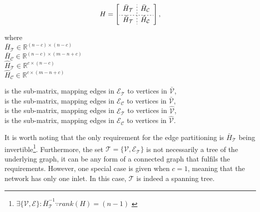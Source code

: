 \begin{equation}
\label{H_matrix_sub}
H=
\left[
\begin{array}{c;{2pt/2pt}r}
\bar{H}_{\mathcal{T}} & \bar{H}_{\mathcal{C}} \\[3pt]
\hdashline[2pt/2pt] 
\hat{H}_{\mathcal{T}} & \hat{H}_{\mathcal{C}}
\end{array}
\right],
\end{equation}

\begin{minipage}[t]{0.3\textwidth}
where\\
\hspace*{8mm} $\bar{H}_{\mathcal{T}} \in \mathbb{R}^{(n-c) \times (n-c)}$\\ 
\hspace*{8mm} $\bar{H}_{\mathcal{C}} \in \mathbb{R}^{(n-c) \times (m\!-\!n\!+\!c)}$\\
\hspace*{8mm} $\hat{H}_{\mathcal{T}} \in \mathbb{R}^{c \times (n-c)}$\\
\hspace*{8mm} $\hat{H}_{\mathcal{C}} \in \mathbb{R}^{c \times (m-n+c)}$
\end{minipage}
\begin{minipage}[t]{0.68\textwidth}
\vspace*{-0.1mm}
is the sub-matrix, mapping edges in $\mathcal{E_{\mathcal{T}}}$ to vertices in $\bar{\mathcal{V}}$,\\ 
is the sub-matrix, mapping edges in $\mathcal{E_{\mathcal{C}}}$ to vertices in $\bar{\mathcal{V}}$,\\
is the sub-matrix, mapping edges in $\mathcal{E_{\mathcal{T}}}$ to vertices in $\hat{\mathcal{V}}$,\\
is the sub-matrix, mapping edges in $\mathcal{E_{\mathcal{C}}}$ to vertices in $\hat{\mathcal{V}}$. 
\end{minipage}

It is worth noting that the only requirement for the edge partitioning is $\bar{H}_{\mathcal{T}}$ being invertible\footnote{$\exists \{\mathcal{V}, \mathcal{E} \} : \bar{H}^{-1}_{\mathcal{T}} \because rank(H) = (n-1) $ \cite{deo2017graph} }. Furthermore, the set $\mathcal{T} = \{\mathcal{V}, \mathcal{E_{\mathcal{T}}} \}$ is not necessarily a tree of the underlying graph, it can be any form of a connected graph that fulfils the requirements. However, one special case is given when $c = 1$, meaning that the network has only one inlet. In this case, $\mathcal{T}$ is indeed a spanning tree. 

